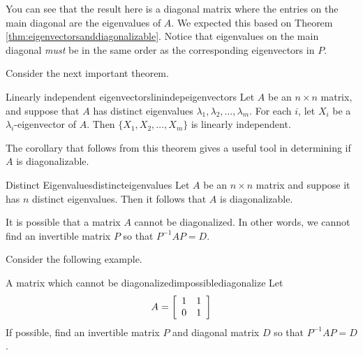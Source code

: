 \begin{solution}
You can see that the result here is a diagonal matrix where the entries on the main diagonal are the eigenvalues of $A$. We expected this based on 
Theorem \ref{thm:eigenvectorsanddiagonalizable}. Notice that eigenvalues on the main diagonal {\em must\em} be in the same order as the corresponding eigenvectors in $P$. 
\end{solution}

Consider the next important theorem.

\begin{theorem}{Linearly independent eigenvectors}{linindepeigenvectors}
Let $A$ be an $n\times n$ matrix, and suppose that $A$ 
has distinct eigenvalues $\lambda_1, \lambda_2, \ldots, \lambda_m$.
For each $i$, let $X_i$ be a $\lambda_i$-eigenvector of $A$.
Then $\{ X_1, X_2, \ldots, X_m\}$ is 
linearly independent.
\end{theorem}

The corollary that follows from this theorem gives a useful tool in determining if $A$ is diagonalizable. 

\begin{corollary}{Distinct Eigenvalues}{distincteigenvalues}
Let $A$ be an $n \times n$ matrix and suppose it has $n$ distinct eigenvalues. Then it follows that $A$ is diagonalizable.
\end{corollary}

It is possible that a matrix $A$ cannot be diagonalized. In other words, we cannot find an invertible matrix $P$ so that $P^{-1}AP=D$.

Consider the following example. 

\begin{example}{A matrix which cannot be diagonalized}{impossiblediagonalize}
Let
\begin{equation*}
A = 
\left[
\begin{array}{rr}
1 & 1 \\
0 & 1
\end{array}
\right]
\end{equation*}
If possible, find an invertible matrix $P$ and diagonal matrix $D$ so that $P^{-1}AP=D$.
\end{example}

